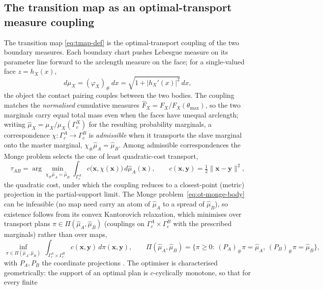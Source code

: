 \documentclass{svjour3}                 %
\newcommand{\norm}[1]{\lVert#1\rVert}
\newcommand{\abs}[1]{\lvert#1\rvert}
\newcommand{\xbf}{\bm{x}}
\newcommand{\ybf}{\bm{y}}
\newcommand{\tmap}{\tau_{AB}}
\newcommand{\map}[1]{\varphi_{#1}}
\begin{document}
\subsection{The transition map as an optimal-transport measure coupling}\label{sec:tmap:ot}

The transition map \eqref{eq:tmap-def} is the optimal-transport coupling of the
two boundary measures. Each boundary chart pushes Lebesgue measure on its
parameter line forward to the arclength measure on the face; for a single-valued face $z=h_X(x)$,
\begin{equation}\label{eq:ot-measure-body}
d\mu_X=(\map{X})_\#\,dx=\sqrt{1+\abs{h_X'(x)}^2}\,dx ,
\end{equation}
the object the contact pairing couples between the two bodies. The coupling matches the \emph{normalised}
cumulative measures $\hat F_X=F_X/F_X(\theta_{\max})$, so the two marginals carry equal total mass even when the
faces have unequal arclength; writing $\hat\mu_X=\mu_X/\mu_X(\Gamma_c^X)$ for the resulting probability
marginals, a correspondence $\chi:\Gamma_c^A\to\Gamma_c^B$ is \emph{admissible} when it transports the slave
marginal onto the master marginal, $\chi_\#\hat\mu_A=\hat\mu_B$. Among admissible correspondences the Monge
problem selects the one of least quadratic-cost transport,
\begin{equation}\label{eq:ot-monge-body}
\tmap=\arg\min_{\chi_\#\hat\mu_A=\hat\mu_B}\int_{\Gamma_c^A} c\big(\xbf,\chi(\xbf)\big)\,d\hat\mu_A(\xbf),\qquad
c(\xbf,\ybf)=\tfrac12\norm{\xbf-\ybf}^2,
\end{equation}
the quadratic cost, under which the coupling reduces to a closest-point (metric) projection in the partial-support limit. The Monge
problem~\eqref{eq:ot-monge-body} can be infeasible (no map need carry an atom of $\hat\mu_A$ to a spread of
$\hat\mu_B$), so existence follows from its convex Kantorovich relaxation, which minimises over
transport plans $\pi\in\Pi(\hat\mu_A,\hat\mu_B)$ (couplings on $\Gamma_c^A\times\Gamma_c^B$ with the prescribed
marginals) rather than over maps,
\begin{equation}\label{eq:ot-kantorovich-body}
\inf_{\pi\in\Pi(\hat\mu_A,\hat\mu_B)}\ \int_{\Gamma_c^A\times\Gamma_c^B}\!\! c(\xbf,\ybf)\,d\pi(\xbf,\ybf),\qquad
\Pi(\hat\mu_A,\hat\mu_B)=\big\{\pi\ge0:\ (P_A)_\#\pi=\hat\mu_A,\ (P_B)_\#\pi=\hat\mu_B\big\},
\end{equation}
with $P_A,P_B$ the coordinate projections \citep{villani2009optimal,santambrogio2015optimal}. The optimiser is
characterised geometrically: the support of an optimal plan is $c$-cyclically monotone, so that for every finite
\end{document}
